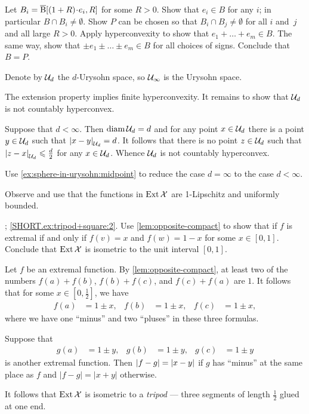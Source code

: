 Let $B_i=\cBall[(1+R)\cdot e_i,R]$ for some $R>0$.
Show that $ e_i\in B$ for any $i$; in particular $B\cap B_i\ne\emptyset$.
Show $P$ can be chosen so that $B_i\cap B_j\ne \emptyset$ for all $i$ and~$j$ and all large $R>0$.
Apply hyperconvexity to show that $e_1+\dots+ e_m\in B$.
The same way, show that $\pm e_1\pm \dots\pm e_m\in B$ for all choices of signs.
Conclude that $B=P$.


Denote by $\mathcal{U}_d$ the $d$-Urysohn space,
so $\mathcal{U}_\infty$ is the Urysohn space.

The extension property implies finite hyperconvexity.
It remains to show that $\mathcal{U}_d$ is not countably hyperconvex.

Suppose that $d<\infty$.
Then $\operatorname{\rm diam}\nolimits\mathcal{U}_d=d$ and for any point $x\in\mathcal{U}_d$ there is a point $y\in\mathcal{U}_d$ such that $\dist{x}{y}{\spc{U}_d}=d$.
It follows that there is no point $z\in\mathcal{U}_d$ such that $\dist{z}{x}{\spc{U}_d}\le \tfrac d2$ for any $x\in\mathcal{U}_d$.
Whence $\mathcal{U}_d$ is not countably hyperconvex.

Use \ref{ex:sphere-in-urysohn:midpoint} to reduce the case $d=\infty$ to the case $d<\infty$.


Observe and use that the functions in $\mathop{\rm Ext}\nolimits\mathcal{X}$ are 1-Lipschitz and uniformly bounded.

\parbf{\ref{ex:tripod+square}}; \ref{SHORT.ex:tripod+square:2}.
Use \ref{lem:opposite-compact} to show that if $f$ is extremal if and only if $f(v)=x$ and $f(w)=1-x$ for some $x\in [0,1]$.
Conclude that $\mathop{\rm Ext}\nolimits\mathcal{X}$ is isometric to the unit interval $[0,1]$.

Let $f$ be an extremal function.
By \ref{lem:opposite-compact}, at least two of the numbers $f(a)+f(b)$, $f(b)+f(c)$, and $f(c)+f(a)$ are $1$.
It follows that for some $x\in[0,\tfrac12]$, we have 
\begin{align*}
f(a)&=1\pm x,&
f(b)&=1\pm x,&
f(c)&=1\pm x,
\end{align*}
where we have one ``minus'' and two ``pluses'' in these three formulas.

Suppose that
\begin{align*}
g(a)&=1\pm y,& g(b)&=1\pm y,& g(c)&=1\pm y
\end{align*}
is another extremal function.
Then $|f-g|\z=|x-y|$ if $g$ has ``minus'' at the same place as $f$ and $|f-g|=|x+y|$ otherwise.

It follows that $\mathop{\rm Ext}\nolimits\mathcal{X}$ is isometric to a {}\emph{tripod} --- three segments of length $\tfrac12$ glued at one end.


